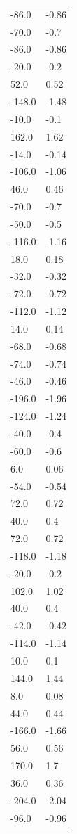 \begin{longtable}{ll}
-86.0 & -0.86 \\
-70.0 & -0.7 \\
-86.0 & -0.86 \\
-20.0 & -0.2 \\
52.0 & 0.52 \\
-148.0 & -1.48 \\
-10.0 & -0.1 \\
162.0 & 1.62 \\
-14.0 & -0.14 \\
-106.0 & -1.06 \\
46.0 & 0.46 \\
-70.0 & -0.7 \\
-50.0 & -0.5 \\
-116.0 & -1.16 \\
18.0 & 0.18 \\
-32.0 & -0.32 \\
-72.0 & -0.72 \\
-112.0 & -1.12 \\
14.0 & 0.14 \\
-68.0 & -0.68 \\
-74.0 & -0.74 \\
-46.0 & -0.46 \\
-196.0 & -1.96 \\
-124.0 & -1.24 \\
-40.0 & -0.4 \\
-60.0 & -0.6 \\
6.0 & 0.06 \\
-54.0 & -0.54 \\
72.0 & 0.72 \\
40.0 & 0.4 \\
72.0 & 0.72 \\
-118.0 & -1.18 \\
-20.0 & -0.2 \\
102.0 & 1.02 \\
40.0 & 0.4 \\
-42.0 & -0.42 \\
-114.0 & -1.14 \\
10.0 & 0.1 \\
144.0 & 1.44 \\
8.0 & 0.08 \\
44.0 & 0.44 \\
-166.0 & -1.66 \\
56.0 & 0.56 \\
170.0 & 1.7 \\
36.0 & 0.36 \\
-204.0 & -2.04 \\
-96.0 & -0.96 \\

\end{longtable}
